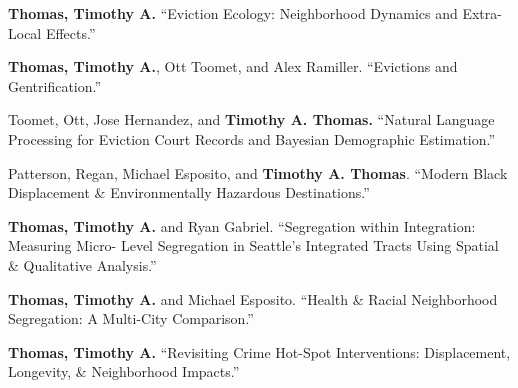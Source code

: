 
\begin{cvparagraph}


\textbf{Thomas, Timothy A.} “Eviction Ecology: Neighborhood Dynamics and Extra-Local Effects.”

\end{cvparagraph}

\begin{cvparagraph}

\textbf{Thomas, Timothy A.}, Ott Toomet, and Alex Ramiller. “Evictions and Gentrification.”
\end{cvparagraph}

\begin{cvparagraph}

Toomet, Ott, Jose Hernandez, and \textbf{Timothy A. Thomas.} “Natural Language Processing for Eviction Court Records and Bayesian Demographic Estimation.”
\end{cvparagraph}

\begin{cvparagraph}

Patterson, Regan, Michael Esposito, and \textbf{Timothy A. Thomas}. “Modern Black Displacement \& Environmentally Hazardous Destinations.”
\end{cvparagraph}

\begin{cvparagraph}

\textbf{Thomas, Timothy A.} and Ryan Gabriel. “Segregation within Integration: Measuring Micro- Level Segregation in Seattle's Integrated Tracts Using Spatial \& Qualitative Analysis.”
\end{cvparagraph}

\begin{cvparagraph}

\textbf{Thomas, Timothy A.} and Michael Esposito. “Health \& Racial Neighborhood Segregation: A Multi-City Comparison.”
\end{cvparagraph}

\begin{cvparagraph}

\textbf{Thomas, Timothy A.} “Revisiting Crime Hot-Spot Interventions: Displacement, Longevity, \& Neighborhood Impacts.”
\end{cvparagraph}